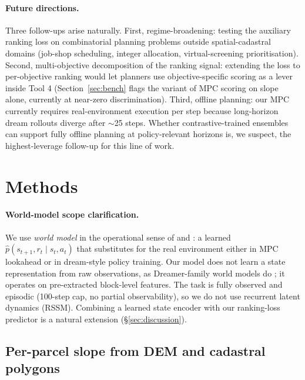 \documentclass[11pt]{article}
\begin{document}
\paragraph{Future directions.} Three follow-ups arise naturally. First, regime-broadening: testing the auxiliary ranking loss on combinatorial planning problems outside spatial-cadastral domains (job-shop scheduling, integer allocation, virtual-screening prioritisation). Second, multi-objective decomposition of the ranking signal: extending the loss to per-objective ranking would let planners use objective-specific scoring as a lever inside Tool 4 (Section~\ref{sec:bench} flags the variant of MPC scoring on slope alone, currently at near-zero discrimination). Third, offline planning: our MPC currently requires real-environment execution per step because long-horizon dream rollouts diverge after $\sim$25 steps. Whether contrastive-trained ensembles can support fully offline planning at policy-relevant horizons is, we suspect, the highest-leverage follow-up for this line of work.

\section*{Methods}
\label{sec:methods}

\paragraph{World-model scope clarification.} We use \emph{world model} in the operational sense of \citet{chua2018deep} and \citet{janner2019trust}: a learned $\hat{p}(s_{t+1}, r_t \mid s_t, a_t)$ that substitutes for the real environment either in MPC lookahead or in dream-style policy training. Our model does not learn a state representation from raw observations, as Dreamer-family world models do \citep{hafner2025dreamerv3}; it operates on pre-extracted block-level features. The task is fully observed and episodic (100-step cap, no partial observability), so we do not use recurrent latent dynamics (RSSM). Combining a learned state encoder with our ranking-loss predictor is a natural extension (\S\ref{sec:discussion}).

\subsection*{Per-parcel slope from DEM and cadastral polygons}\label{sec:methods-prepare}
\end{document}
